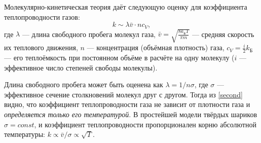 \documentclass[a4paper, 12pt]{article}
\begin{document}
    Молекулярно-кинетическая теория даёт следующую оценку для коэффициента теплопроводности газов:
    \begin{equation}
        k \sim \lambda\bar{v} \cdot nc_{V},
        \label{second}
    \end{equation}
    где $ \lambda $ — длина свободного пробега молекул газа, $ \bar{v} = \sqrt{\frac{8 k_{\text{Б}} T}{\pi m}} $ — средняя скорость их теплового движения, $ n $ — концентрация (объёмная плотность) газа, $ c_{V} = \frac{i}{2} k_{\text{Б}} $ — его теплоёмкость при постоянном объёме в расчёте на одну молекулу ($ i $ — эффективное число степеней свободы молекулы).
    
    Длина свободного пробега может быть оценена как $ \lambda = 1/n\sigma $, где $ \sigma $ — эффективное сечение столкновений молекул друг с другом. Тогда из \eqref{second} видно, что коэффициент теплопроводности газа не зависит от плотности газа и \textit{определяется только его температурой}. В простейшей модели твёрдых шариков $ \sigma = const $, и коэффициент теплопроводности пропорционален корню абсолютной температуры: $ k \propto \bar{v}/\sigma \propto \sqrt{T} $.
    
\end{document}
